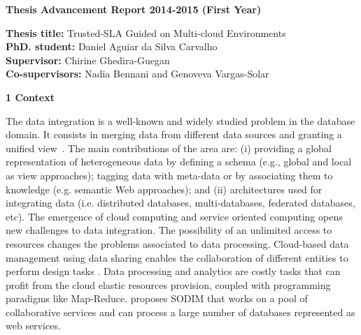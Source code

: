\documentclass[11pt,a4paper,oneside]{report}
\author{Daniel Aguiar da Silva Carvalho}
\begin{document}
\sffamily
\begin{center}
\textbf{\large{Thesis Advancement Report 2014-2015 (First Year)}}
\end{center}

\begin{flushleft}
\textbf{Thesis title:} Trusted-SLA Guided on Multi-cloud Environments \\
\textbf{PhD. student:} Daniel Aguiar da Silva Carvalho \\
\textbf{Supervisor:} Chirine Ghedira-Guegan \\ 
\textbf{Co-supervisors:} Nadia Bennani and Genoveva Vargas-Solar
\end{flushleft}


\begin{flushleft}
\textbf{1 Context}\\
\end{flushleft} 
The data integration is a well-known and widely studied problem in the database domain. 
It consists in merging data from different data sources and granting a unified view~\cite{Lenzerini:2002}. 
%
The main contributions of the area are: (i) providing a global  representation of heterogeneous data  by defining a schema (e.g., global and local as view approaches); tagging data with meta-data or by associating them to knowledge (e.g. semantic Web approaches); and (ii)   architectures used for integrating data (i.e. distributed databases, multi-databases,  federated databases, etc).
%
The emergence of cloud computing and service oriented computing opens new challenges to data integration. 
The possibility of an unlimited access to resources  changes the problems associated to data processing. Cloud-based data management using data sharing  enables the collaboration of different entities to perform design tasks \cite{Gonzalez:2010,Gonzalez:2010b}. Data processing and analytics are costly tasks that can profit from the cloud elastic resources provision, coupled with  programming paradigms like Map-Reduce. \cite{078} proposes SODIM that works on a pool of collaborative services and can process a large number of databases represented as web services. 

\end{document}
